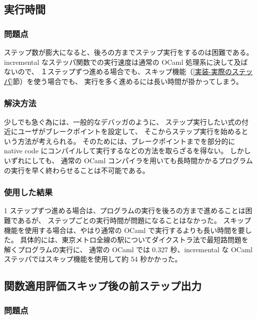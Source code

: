 \subsection{実行時間}
\label{予想される問題点-実行時間}

\subsubsection{問題点}

ステップ数が膨大になると、後ろの方までステップ実行をするのは困難である。
incremental なステッパ関数での実行速度は通常の OCaml 処理系に決して及ばないので、
１ステップずつ進める場合でも、スキップ機能（\ref{実装-実際のステッパ}節）を使う場合でも、
実行を多く進めるには長い時間が掛かってしまう。

\subsubsection{解決方法}
少しでも急ぐ為には、一般的なデバッガのように、
ステップ実行したい式の付近にユーザがブレークポイントを設定して、
そこからステップ実行を始めるという方法が考えられる。
そのためには、ブレークポイントまでを部分的に native code にコンパイルして実行するなどの方法を取らざるを得ない。
しかしいずれにしても、
通常の OCaml コンパイラを用いても長時間かかるプログラムの実行を早く終わらせることは不可能である。

\subsubsection{使用した結果}

1 ステップずつ進める場合は、プログラムの実行を後ろの方まで進めることは困難であるが、
ステップごとの実行時間が問題になることはなかった。
スキップ機能を使用する場合は、やはり通常の OCaml で実行するよりも長い時間を要した。
具体的には、東京メトロ全線の駅についてダイクストラ法で最短路問題を解くプログラムの実行に、
通常の OCaml では 0.327 秒、incremental な OCaml ステッパではスキップ機能を使用して約 54 秒かかった。

\subsection{関数適用評価スキップ後の前ステップ出力}

\subsubsection{問題点}

